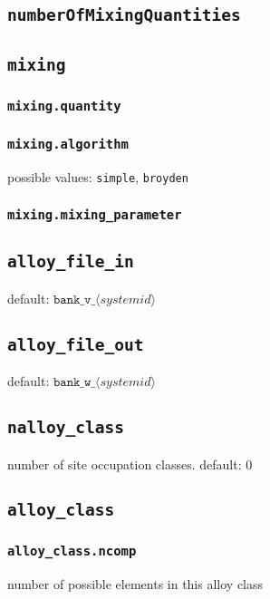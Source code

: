 \subsection{\texttt{numberOfMixingQuantities}}

\subsection{\texttt{mixing}}

\subsubsection{\texttt{mixing.quantity}}

\subsubsection{\texttt{mixing.algorithm}}
possible values: \texttt{simple}, \texttt{broyden}

\subsubsection{\texttt{mixing.mixing\_parameter}}


\subsection{\texttt{alloy\_file\_in}}
default: $\texttt{bank\_v\_}\langle\textit{systemid}\rangle$

\subsection{\texttt{alloy\_file\_out}}
default: $\texttt{bank\_w\_}\langle\textit{systemid}\rangle$

\subsection{\texttt{nalloy\_class}}
number of site occupation classes.
default: 0

\subsection{\texttt{alloy\_class}}
\subsubsection{\texttt{alloy\_class.ncomp}}
number of possible elements in this alloy class
